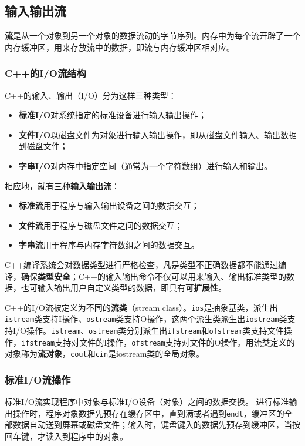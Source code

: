 \documentclass[10pt, a4paper, oneside, fontset=none]{ctexart}
\theoremstyle{plain}
\theoremstyle{definition}
\newcommand{\tboba}[1]{\textbf{\kai\color{bali!75!black}#1}}
\begin{document}
\subsection{输入输出流}

\tboba{流}是从一个对象到另一个对象的数据流动的字节序列。内存中为每个流开辟了一个内存缓冲区，用来存放流中的数据，即流与内存缓冲区相对应。

\subsubsection{C++的I/O流结构}

C++的输入、输出（I/O）分为这样三种类型：
\begin{itemize}
	\item \textbf{标准I/O\quad}对系统指定的标准设备进行输入输出操作；
	\item \textbf{文件I/O\quad}以磁盘文件为对象进行输入输出操作，即从磁盘文件输入、输出数据到磁盘文件；
	\item \textbf{字串I/O\quad}对内存中指定空间（通常为一个字符数组）进行输入和输出。
\end{itemize}
相应地，就有三种\tboba{输入输出流}：
\begin{itemize}
	\item \textbf{标准流\quad}用于程序与输入输出设备之间的数据交互；
	\item \textbf{文件流\quad}用于程序与磁盘文件之间的数据交互；
	\item \textbf{字串流\quad}用于程序与内存字符数组之间的数据交互。
\end{itemize}
C++编译系统会对数据类型进行严格检查，凡是类型不正确数据都不能通过编译，确保\textbf{类型安全}；C++的输入输出命令不仅可以用来输入、输出标准类型的数据，也可输入输出用户自定义类型的数据，即具有\textbf{可扩展性}。

C++的I/O流被定义为不同的\tboba{流类}（stream class）。\texttt{ios}是抽象基类，派生出\texttt{istream}类支持I操作、\texttt{ostream}类支持O操作，这两个派生类派生出\texttt{iostream}类支持I/O操作。\texttt{istream}、\texttt{ostream}类分别派生出\texttt{ifstream}和\texttt{ofstream}类支持文件操作，\texttt{ifstream}支持对文件的I操作，\texttt{ofstream}支持对文件的O操作。用流类定义的对象称为\tboba{流对象}，\texttt{cout}和\texttt{cin}是iostream类的全局对象。

\subsubsection{标准I/O流操作}

标准I/O流实现程序中对象与标准I/O设备（对象）之间的数据交换。
进行标准输出操作时，程序对象数据先预存在缓存区中，直到满或者遇到\texttt{endl}，缓冲区的全部数据自动送到屏幕或磁盘文件；输入时，键盘键入的数据先预存到缓冲区，当按回车键，才读入到程序中的对象。
\end{document}
